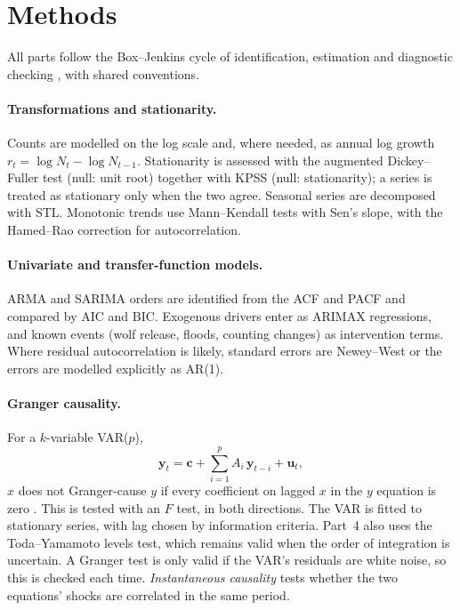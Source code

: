 \documentclass[11pt,a4paper]{article}
\begin{document}
\section{Methods}
All parts follow the Box--Jenkins cycle of identification, estimation and diagnostic checking \citep{box2015}, with shared conventions.

\paragraph{Transformations and stationarity.} Counts are modelled on the log scale and, where needed, as annual log growth $r_t=\log N_t-\log N_{t-1}$. Stationarity is assessed with the augmented Dickey--Fuller test (null: unit root) together with KPSS (null: stationarity); a series is treated as stationary only when the two agree. Seasonal series are decomposed with STL. Monotonic trends use Mann--Kendall tests with Sen's slope, with the Hamed--Rao correction for autocorrelation.

\paragraph{Univariate and transfer-function models.} ARMA and SARIMA orders are identified from the ACF and PACF and compared by AIC and BIC. Exogenous drivers enter as ARIMAX regressions, and known events (wolf release, floods, counting changes) as intervention terms. Where residual autocorrelation is likely, standard errors are Newey--West or the errors are modelled explicitly as AR(1).

\paragraph{Granger causality.} For a $k$-variable VAR($p$),
\begin{equation}
\mathbf{y}_t=\mathbf{c}+\sum_{i=1}^{p}A_i\,\mathbf{y}_{t-i}+\mathbf{u}_t ,
\end{equation}
$x$ does not Granger-cause $y$ if every coefficient on lagged $x$ in the $y$ equation is zero \citep{granger1969}. This is tested with an $F$ test, in both directions. The VAR is fitted to stationary series, with lag chosen by information criteria. Part~4 also uses the Toda--Yamamoto levels test, which remains valid when the order of integration is uncertain. A Granger test is only valid if the VAR's residuals are white noise, so this is checked each time. \emph{Instantaneous causality} tests whether the two equations' shocks are correlated in the same period.
\end{document}
